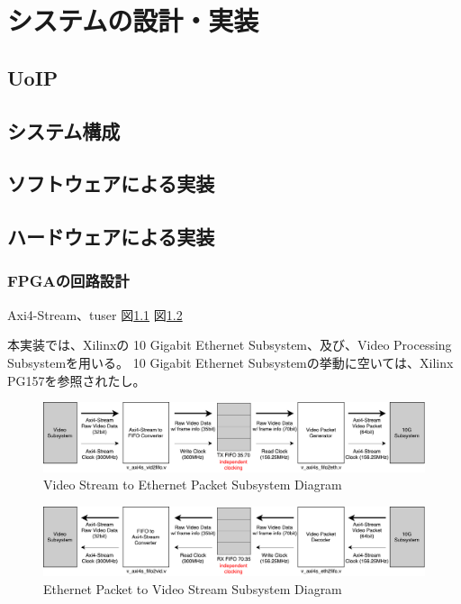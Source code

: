 \chapter{システムの設計・実装}
\label{chap:implementation}

\section{UoIP} %

\section{システム構成}

\section{ソフトウェアによる実装}

\section{ハードウェアによる実装}

\subsection{FPGAの回路設計}

Axi4-Stream、tuser
図\ref{fig:fpga-video-ethernet-diagram}
図\ref{fig:fpga-ethernet-video-diagram}

本実装では、Xilinxの 10 Gigabit Ethernet Subsystem、及び、Video Processing Subsystemを用いる。
10 Gigabit Ethernet Subsystemの挙動に空いては、Xilinx PG157\cite{xilinx-pg157}を参照されたし。
\cite{xilinx-pg235}
\cite{xilinx-pg236}

\begin{figure}[htbp]
    \begin{center}
        \includegraphics[bb=0 0 911 166,width=15.5cm]{img/fpga-video-ethernet-diagram.pdf}
    \end{center}
    \caption{Video Stream to Ethernet Packet Subsystem Diagram}
    \label{fig:fpga-video-ethernet-diagram}
\end{figure}

\begin{figure}[htbp]
    \begin{center}
        \includegraphics[bb=0 0 911 166,width=15.5cm]{img/fpga-ethernet-video-diagram.pdf}
    \end{center}
    \caption{Ethernet Packet to Video Stream Subsystem Diagram}
    \label{fig:fpga-ethernet-video-diagram}
\end{figure}

